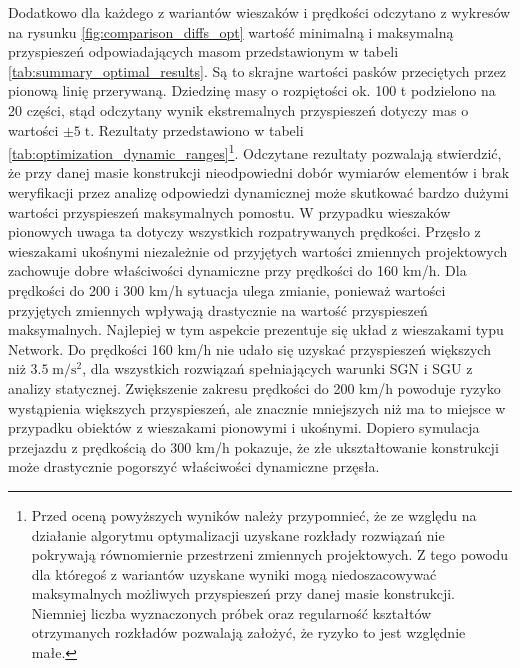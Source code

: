 Dodatkowo dla każdego z wariantów wieszaków i prędkości odczytano z wykresów na rysunku \ref{fig:comparison_diffs_opt} wartość minimalną i maksymalną przyspieszeń odpowiadających masom przedstawionym w tabeli \ref{tab:summary_optimal_results}. Są to skrajne wartości pasków przeciętych przez pionową linię przerywaną. Dziedzinę masy o rozpiętości ok. 100 t podzielono na 20 części, stąd odczytany wynik ekstremalnych przyspieszeń dotyczy mas o wartości $\pm 5\;\mathrm{t}$. Rezultaty przedstawiono w tabeli \ref{tab:optimization_dynamic_ranges}\footnote{ 
	Przed oceną powyższych wyników należy przypomnieć, że ze względu na działanie algorytmu optymalizacji uzyskane rozkłady rozwiązań nie pokrywają równomiernie przestrzeni zmiennych projektowych. Z tego powodu dla któregoś z wariantów uzyskane wyniki mogą niedoszacowywać maksymalnych możliwych przyspieszeń przy danej masie konstrukcji. Niemniej liczba wyznaczonych próbek oraz regularność kształtów otrzymanych rozkładów pozwalają założyć, że ryzyko to jest względnie małe.}.
Odczytane rezultaty pozwalają stwierdzić, że przy danej masie konstrukcji nieodpowiedni dobór wymiarów elementów i brak weryfikacji przez analizę odpowiedzi dynamicznej może skutkować bardzo dużymi wartości przyspieszeń maksymalnych pomostu. W przypadku wieszaków pionowych uwaga ta dotyczy wszystkich rozpatrywanych prędkości. Przęsło z wieszakami ukośnymi niezależnie od przyjętych wartości zmiennych projektowych zachowuje dobre właściwości dynamiczne przy prędkości do 160 km/h. Dla prędkości do 200 i 300 km/h sytuacja ulega zmianie, ponieważ wartości przyjętych zmiennych wpływają drastycznie na wartość przyspieszeń maksymalnych. Najlepiej w tym aspekcie prezentuje się układ z wieszakami typu Network. Do prędkości 160 km/h nie udało się uzyskać przyspieszeń większych niż $3.5\;\mathrm{m/s^2}$, dla wszystkich rozwiązań spełniających warunki SGN i SGU z analizy statycznej. Zwiększenie zakresu prędkości do 200 km/h powoduje ryzyko wystąpienia większych przyspieszeń, ale znacznie mniejszych niż ma to miejsce w przypadku obiektów z wieszakami pionowymi i ukośnymi. Dopiero symulacja przejazdu z prędkością do 300 km/h pokazuje, że złe ukształtowanie konstrukcji może drastycznie pogorszyć właściwości dynamiczne przęsła.






